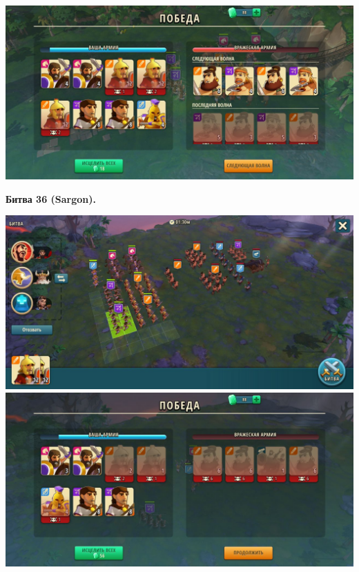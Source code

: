 \noindent\includegraphics[width=\linewidth]{./parts/media/TreasureHunt/35/sargon/photo_2022-04-07_10-08-41.jpg} \newline

\newpage
\begin{center}
	\hypertarget{fight36}{\textbf{Битва 36 (Sargon).}}
\end{center}
\noindent\includegraphics[width=\linewidth]{./parts/media/TreasureHunt/36/sargon/photo_2022-04-07_13-16-23.jpg} \newline
\noindent\includegraphics[width=\linewidth]{./parts/media/TreasureHunt/36/sargon/photo_2022-04-07_13-16-46.jpg} \newline
